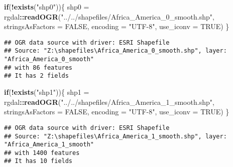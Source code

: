 \documentclass[
]{article}
\newenvironment{Shaded}{\begin{snugshade}}{\end{snugshade}}
\newcommand{\ControlFlowTok}[1]{\textcolor[rgb]{0.13,0.29,0.53}{\textbf{#1}}}
\newcommand{\DataTypeTok}[1]{\textcolor[rgb]{0.13,0.29,0.53}{#1}}
\newcommand{\KeywordTok}[1]{\textcolor[rgb]{0.13,0.29,0.53}{\textbf{#1}}}
\newcommand{\NormalTok}[1]{#1}
\newcommand{\OperatorTok}[1]{\textcolor[rgb]{0.81,0.36,0.00}{\textbf{#1}}}
\newcommand{\OtherTok}[1]{\textcolor[rgb]{0.56,0.35,0.01}{#1}}
\newcommand{\StringTok}[1]{\textcolor[rgb]{0.31,0.60,0.02}{#1}}
\begin{document}
\begin{Shaded}
\begin{Highlighting}[]
{{{{{{{\NormalTok{vc2d }\OperatorTok{%<>%}\StringTok{ }\KeywordTok{bind_rows}\NormalTok{(vc_tmp)}
\NormalTok{vc2d }\OperatorTok{%<>%}\StringTok{ }\KeywordTok{unique}\NormalTok{()}
\NormalTok{vc2d }\OperatorTok{%<>%}\StringTok{ }\KeywordTok{filter}\NormalTok{(}\OperatorTok{!}\KeywordTok{is.na}\NormalTok{(adm0_adm1))}
\end{Highlighting}
\end{Shaded}

\begin{Shaded}
\begin{Highlighting}[]
\ControlFlowTok{if}\NormalTok{(}\OperatorTok{!}\KeywordTok{exists}\NormalTok{(}\StringTok{"shp0"}\NormalTok{))\{}
\NormalTok{  shp0 =}\StringTok{ }\NormalTok{rgdal}\OperatorTok{::}\KeywordTok{readOGR}\NormalTok{(}\StringTok{"../../shapefiles/Africa_America_0_smooth.shp"}\NormalTok{,}
                        \DataTypeTok{stringsAsFactors =} \OtherTok{FALSE}\NormalTok{,}
                        \DataTypeTok{encoding =} \StringTok{"UTF-8"}\NormalTok{,}
                        \DataTypeTok{use_iconv =} \OtherTok{TRUE}\NormalTok{)}
\NormalTok{\}}
\end{Highlighting}
\end{Shaded}

\begin{verbatim}
## OGR data source with driver: ESRI Shapefile 
## Source: "Z:\shapefiles\Africa_America_0_smooth.shp", layer: "Africa_America_0_smooth"
## with 86 features
## It has 2 fields
\end{verbatim}

\begin{Shaded}
\begin{Highlighting}[]
\ControlFlowTok{if}\NormalTok{(}\OperatorTok{!}\KeywordTok{exists}\NormalTok{(}\StringTok{"shp1"}\NormalTok{))\{}
\NormalTok{  shp1 =}\StringTok{ }\NormalTok{rgdal}\OperatorTok{::}\KeywordTok{readOGR}\NormalTok{(}\StringTok{"../../shapefiles/Africa_America_1_smooth.shp"}\NormalTok{,}
                        \DataTypeTok{stringsAsFactors =} \OtherTok{FALSE}\NormalTok{,}
                        \DataTypeTok{encoding =} \StringTok{"UTF-8"}\NormalTok{,}
                        \DataTypeTok{use_iconv =} \OtherTok{TRUE}\NormalTok{)}
\NormalTok{\}}
\end{Highlighting}
\end{Shaded}

\begin{verbatim}
## OGR data source with driver: ESRI Shapefile 
## Source: "Z:\shapefiles\Africa_America_1_smooth.shp", layer: "Africa_America_1_smooth"
## with 1400 features
## It has 10 fields
\end{verbatim}
\end{document}
